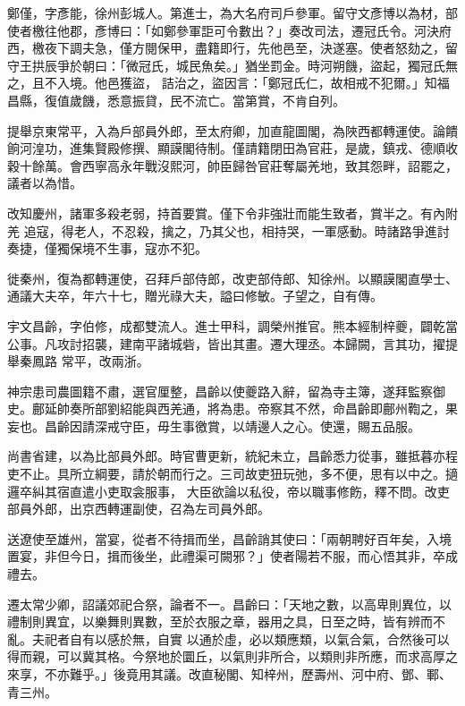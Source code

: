 \begin{pinyinscope}
 鄭僅，字彥能，徐州彭城人。第進士，為大名府司戶參軍。留守文彥博以為材，部使者檄往他郡，彥博曰：「如鄭參軍詎可令數出？」奏改司法，遷冠氏令。河決府西，檄夜下調夫急，僅方閱保甲，盡籍即行，先他邑至，決遂塞。使者怒劾之，留守王拱辰爭於朝曰：「微冠氏，城民魚矣。」猶坐罰金。時河朔饑，盜起，獨冠氏無之，且不入境。他邑獲盜，
 詰治之，盜因言：「鄭冠氏仁，故相戒不犯爾。」知福昌縣，復值歲饑，悉意振貸，民不流亡。當第賞，不肯自列。



 提舉京東常平，入為戶部員外郎，至太府卿，加直龍圖閣，為陜西都轉運使。論饋餉河湟功，進集賢殿修撰、顯謨閣待制。僅請籍閉田為官莊，是歲，鎮戎、德順收穀十餘萬。會西寧高永年戰沒熙河，帥臣歸咎官莊奪屬羌地，致其怨畔，詔罷之，議者以為惜。



 改知慶州，諸軍多殺老弱，持首要賞。僅下令非強壯而能生致者，賞半之。有內附羌
 追寇，得老人，不忍殺，擒之，乃其父也，相持哭，一軍感動。時諸路爭進討奏捷，僅獨保境不生事，寇亦不犯。



 徙秦州，復為都轉運使，召拜戶部侍郎，改吏部侍郎、知徐州。以顯謨閣直學士、通議大夫卒，年六十七，贈光祿大夫，謚曰修敏。子望之，自有傳。



 宇文昌齡，字伯修，成都雙流人。進士甲科，調榮州推官。熊本經制梓夔，闢乾當公事。凡攻討招襲，建南平諸城砦，皆出其畫。遷大理丞。本歸闕，言其功，擢提舉秦鳳路
 常平，改兩浙。



 神宗患司農圖籍不肅，選官厘整，昌齡以使夔路入辭，留為寺主簿，遂拜監察御史。鄜延帥奏所部劉紹能與西羌通，將為患。帝察其不然，命昌齡即鄜州鞫之，果妄也。昌齡因請深戒守臣，毋生事徼賞，以靖邊人之心。使還，賜五品服。



 尚書省建，以為比部員外郎。時官曹更新，統紀未立，昌齡悉力從事，雖抵暮亦程吏不止。具所立綱要，請於朝而行之。三司故吏狃玩弛，多不便，思有以中之。擿邏卒糾其宿直遣小吏取衾服事，
 大臣欲論以私役，帝以職事修飭，釋不問。改吏部員外郎，出京西轉運副使，召為左司員外郎。



 送遼使至雄州，當宴，從者不待揖而坐，昌齡誚其使曰：「兩朝聘好百年矣，入境置宴，非但今日，揖而後坐，此禮渠可闕邪？」使者陽若不服，而心悟其非，卒成禮去。



 遷太常少卿，詔議郊祀合祭，論者不一。昌齡曰：「天地之數，以高卑則異位，以禮制則異宜，以樂舞則異數，至於衣服之章，器用之具，日至之時，皆有辨而不亂。夫祀者自有以感於無，自實
 以通於虛，必以類應類，以氣合氣，合然後可以得而親，可以冀其格。今祭地於圜丘，以氣則非所合，以類則非所應，而求高厚之來享，不亦難乎。」後竟用其議。改直秘閣、知梓州，歷壽州、河中府、鄧、鄆、青三州。




\end{pinyinscope}
